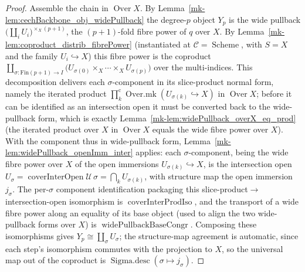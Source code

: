 \begin{proof}
  Assemble the chain in \(\operatorname{Over} X\). By
  Lemma~\ref{mk-lem:cechBackbone_obj_widePullback} the degree-\(p\) object \(Y_p\) is the wide
  pullback \(\bigl(\coprod_i U_i\bigr)^{\times_X (p+1)}\), the \((p+1)\)-fold fibre power of
  \(q\) over \(X\). By Lemma~\ref{mk-lem:coproduct_distrib_fibrePower} (instantiated at
  \(\mathcal{C} = \operatorname{Scheme}\), with \(S = X\) and the family
  \(U_i \hookrightarrow X\)) this fibre power is the coproduct
  \(\coprod_{\sigma : \mathrm{Fin}(p+1) \to I} \bigl(U_{\sigma(0)} \times_X \cdots \times_X
  U_{\sigma(p)}\bigr)\) over the multi-indices. This decomposition delivers each \(\sigma\)-component in
  its slice-product normal form, namely the iterated product
  \(\prod^{\mathrm{c}}_{k}\operatorname{Over.mk}(U_{\sigma(k)} \hookrightarrow X)\) in
  \(\operatorname{Over} X\); before it can be identified as an intersection open it must be converted
  back to the wide-pullback form, which is exactly Lemma~\ref{mk-lem:widePullback_overX_eq_prod} (the
  iterated product over \(X\) in \(\operatorname{Over} X\) equals the wide fibre power over \(X\)). With
  the component thus in wide-pullback form, Lemma~\ref{mk-lem:widePullback_openImm_inter} applies: each
  \(\sigma\)-component, being the wide fibre power over \(X\) of the open immersions
  \(U_{\sigma(k)} \hookrightarrow X\), is the intersection open
  \(U_\sigma = \operatorname{coverInterOpen}\mathcal{U}\,\sigma = \bigcap_k U_{\sigma(k)}\), with
  structure map the open immersion \(j_\sigma\). The per-\(\sigma\) component identification
  packaging this slice-product\(\to\)intersection-open isomorphism is
  \(\operatorname{coverInterProdIso}\), and the transport of a wide fibre power along an
  equality of its base object (used to align the two wide-pullback forms over \(X\)) is
  \(\operatorname{widePullbackBaseCongr}\). Composing these
  isomorphisms gives \(Y_p \cong \coprod_\sigma U_\sigma\); the structure-map agreement is
  automatic, since each step's isomorphism commutes with the projection to \(X\), so the
  universal map out of the coproduct is \(\operatorname{Sigma.desc}(\sigma \mapsto j_\sigma)\).


\end{proof}
